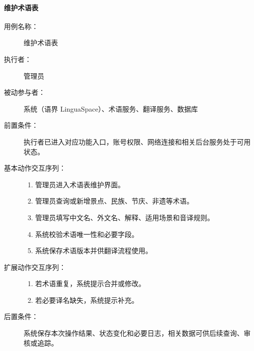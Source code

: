 \paragraph{维护术语表}
\begin{description}
  \item[用例名称：] 维护术语表
  \item[执行者：] 管理员
  \item[被动参与者：] 系统（语界 LinguaSpace）、术语服务、翻译服务、数据库
  \item[前置条件：] 执行者已进入对应功能入口，账号权限、网络连接和相关后台服务处于可用状态。
  \item[基本动作交互序列：]
  \begin{enumerate}
    \item 管理员进入术语表维护界面。
    \item 管理员查询或新增景点、民族、节庆、非遗等术语。
    \item 管理员填写中文名、外文名、解释、适用场景和音译规则。
    \item 系统校验术语唯一性和必要字段。
    \item 系统保存术语版本并供翻译流程使用。
  \end{enumerate}
  \item[扩展动作交互序列：]
  \begin{enumerate}
    \item[4a.] 若术语重复，系统提示合并或修改。
    \item[4b.] 若必要译名缺失，系统提示补充。
  \end{enumerate}
  \item[后置条件：] 系统保存本次操作结果、状态变化和必要日志，相关数据可供后续查询、审核或追踪。
\end{description}

